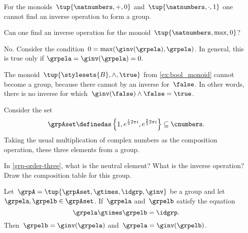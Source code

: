 \begin{example}
    For the monoids~$\tup{\natnumbers, +,0}$ and~$\tup{\natnumbers,\cdot ,1}$ one cannot find an inverse operation to form a group.
\end{example}

\begin{exercise}
    Can one find an inverse operation for the monoid~$\tup{\natnumbers,\max,0}$?
\end{exercise}
\begin{solution}
    No. Consider the condition~$0=\max(\ginv(\grpela),\grpela)$. In general, this is true only if $\grpela=\ginv(\grpela)=0$.
\end{solution}

\begin{example}
    The monoid~$\tup{\stylesets{B},\wedge, \true}$ from \cref{ex:bool_monoid} cannot become a group, because there cannot by an inverse for~$\false$.
    In other words, there is no inverse for which~$\ginv(\false)\wedge \false=\true$.
\end{example}
\begin{example}
    \label{grp-order-three}
    Consider the set
    \begin{equation*}
        \grpAset \definedas \left\{ 1, e^{\frac{1}{3}2\pi i}, e^{\frac{2 }{3}2\pi i}  \right\} \subseteq \cnumbers.
    \end{equation*}
    Taking the usual multiplication of complex numbers as the composition operation, these three elements from a group.
\end{example}

\begin{gradedexercise}
    \label{ex:GroupWithThreeElements}
    In \cref{grp-order-three}, what is the neutral element? What is the inverse operation?
    Draw the composition table for this group.
\end{gradedexercise}


\begin{lemma}
    \label{lem:inv-op-unique}
    Let~$\grpA = \tup{ \grpAset, \gtimes, \idgrp, \ginv }$ be a group and let~$\grpela, \grpelb \in \grpAset$. If~$\grpela$ and~$\grpelb$ satisfy the equation
    \begin{equation}
        \grpela \gtimes \grpelb = \idgrp.
    \end{equation}
    Then~$\grpelb = \ginv( \grpela )$ and~$\grpela = \ginv(\grpelb)$.
\end{lemma}

